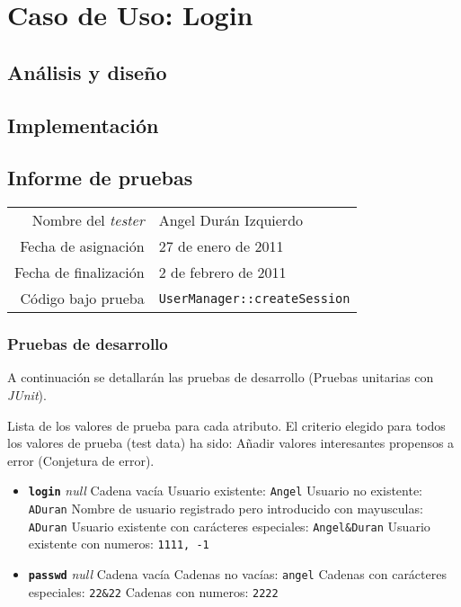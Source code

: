 \section{Caso de Uso: Login}

\subsection{Análisis y diseño}

\subsection{Implementación}

\subsection{Informe de pruebas}

{\small
\begin{tabular}{r|l}
Nombre del \textit{tester} & Angel Durán Izquierdo \\
Fecha de asignación & 27 de enero de 2011 \\
Fecha de finalización & 2 de febrero de 2011 \\
Código bajo prueba & \texttt{UserManager::createSession}
\end{tabular}
}

\subsubsection{Pruebas de desarrollo}

A continuación se detallarán las pruebas de desarrollo (Pruebas unitarias con \textit{JUnit}).

Lista de los valores de prueba para cada atributo.
El criterio elegido para todos los valores de prueba (test data) ha sido: Añadir valores interesantes propensos a error (Conjetura de error).

\begin{itemize}
\item \textbf{\texttt{login}}
\subitem \textit{null}
\subitem Cadena vacía
\subitem Usuario existente: \texttt{Angel}
\subitem Usuario no existente: \texttt{ADuran}
\subitem Nombre de usuario registrado pero introducido con mayusculas: \texttt{ADuran}
\subitem Usuario existente con carácteres especiales: \texttt {Angel\&Duran}
\subitem Usuario existente con numeros: \texttt{1111, -1}

\item \textbf{\texttt{passwd}}
\subitem \textit{null}
\subitem Cadena vacía
\subitem Cadenas no vacías: \texttt{angel}
\subitem Cadenas con carácteres especiales: \texttt{22\&22}
\subitem Cadenas con numeros: \texttt{2222}

\end{itemize}

